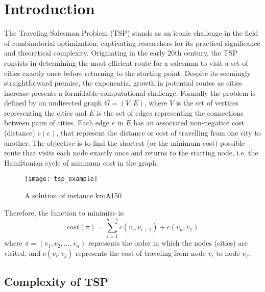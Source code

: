\chapter{Introduction}

The Traveling Salesman Problem (TSP) stands as an iconic challenge in the field of combinatorial optimization,
captivating researchers for its practical significance and theoretical complexity. Originating in the early 20th century,
the TSP consists in determining the most efficient route for a salesman to visit a set of cities exactly once before returning 
to the starting point. Despite its seemingly straightforward premise, the exponential growth in potential routes as cities 
increase presents a formidable computational challenge.\newline
Formally the problem is defined by an undirected graph $G = (V,E)$, where $V$ is the set of vertices representing the cities and
$E$ is the set of edges representing the connections between pairs of cities. Each edge $e$ in $E$ 
has an associated non-negatice cost (distance) $c(e)$, that represent the distance or cost of travelling from one
city to another. The objective is to find the shortest (or the minimum cost) possible route that visits each node exactly
once and returns to the starting node, i.e. the Hamiltonian cycle of minimum cost in the graph.
\begin{figure}[H]
	\centering
	\texttt{[image: tsp\_example]}
	\caption{A solution of instance kroA150}
\end{figure}
Therefore, the function to minimize is:
\[
    cost(\pi) = \sum_{i=1}^{n-1} c(v_i, v_{i+1}) + c(v_n,v_1)
\]
where $\pi = (v_1,v_2,\ldots,v_n)$ represents the order in which the nodes (cities) are visited, and $c(v_i,v_j)$ 
represents the cost of traveling from node $v_i$ to node $v_j$.
\section{Complexity of TSP}

